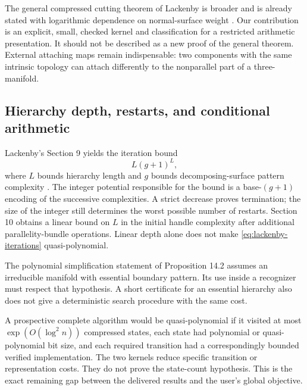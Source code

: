 The general compressed cutting theorem of Lackenby is broader and is
already stated with logarithmic dependence on normal-surface weight
\cite[Theorem 14.4]{Lackenby2026}. Our contribution is an explicit,
small, checked kernel and classification for a restricted arithmetic
presentation. It should not be described as a new proof of the
general theorem. External attaching maps remain indispensable: two
components with the same intrinsic topology can attach differently
to the nonparallel part of a three-manifold.

\subsection{Hierarchy depth, restarts, and conditional arithmetic}

Lackenby's Section 9 yields the iteration bound
\begin{equation}
 L(g+1)^L,
 \label{eq:lackenby-iterations}
\end{equation}
where $L$ bounds hierarchy length and $g$ bounds decomposing-surface
pattern complexity \cite[Proposition 9.1]{Lackenby2026}. The integer
potential responsible for the bound is a base-$(g+1)$ encoding of the
successive complexities. A strict decrease proves termination; the
size of the integer still determines the worst possible number of
restarts. Section 10 obtains a linear bound on $L$ in the initial
handle complexity after additional parallelity-bundle operations.
Linear depth alone does not make \eqref{eq:lackenby-iterations}
quasi-polynomial.

The polynomial simplification statement of Proposition 14.2 assumes
an irreducible manifold with essential boundary pattern. Its use
inside a recognizer must respect that hypothesis. A short certificate
for an essential hierarchy also does not give a deterministic search
procedure with the same cost.

A prospective complete algorithm would be quasi-polynomial if it
visited at most $\exp(O(\log^2 n))$ compressed states, each state had
polynomial or quasi-polynomial bit size, and each required transition
had a correspondingly bounded verified implementation. The two
kernels reduce specific transition or representation costs. They do
not prove the state-count hypothesis. This is the exact remaining
gap between the delivered results and the user's global objective.
